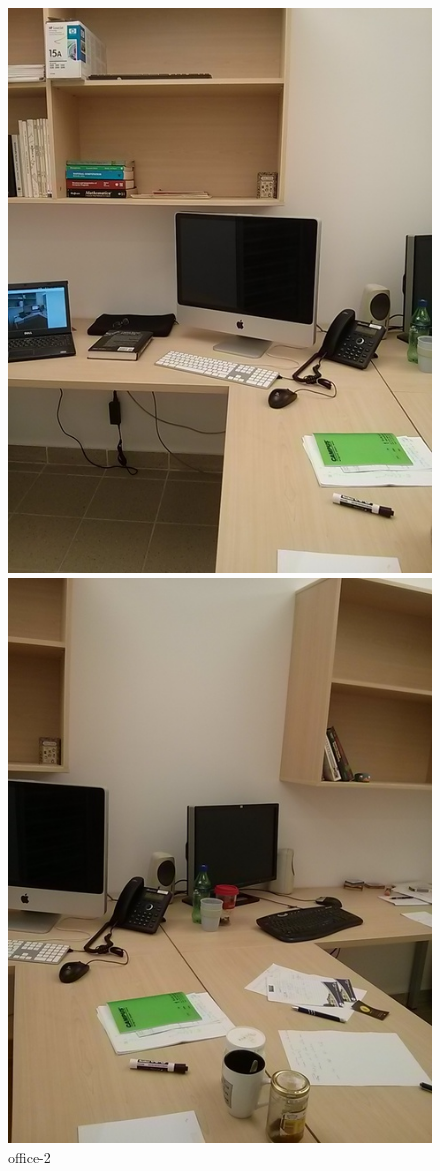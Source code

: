 \documentclass[12pt,a4paper]{report}
\begin{document}
\begin{figure}[!htb]
  \includegraphics[width=\linewidth]{office2}
    \caption{office-2}
\endminipage\hfill
{}
  \includegraphics[width=\linewidth]{office3}

\end{figure}
\end{document}
